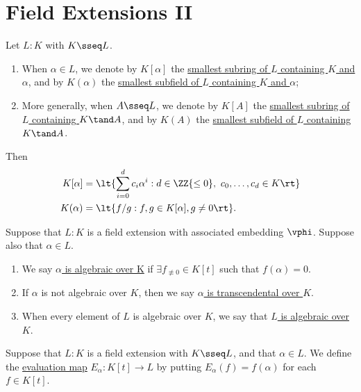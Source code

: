 \documentclass[a4paper]{article}
\begin{document}
\section{Field Extensions II}
\begin{tdefinition}
  Let \( L:K \) with \( K\sseq L \).
  \begin{enumerate}[label=(\roman*)]
    \item When \( \alpha\in L \), we denote by \( K[\alpha] \) the \ul{smallest subring of \( L \) containing \( K \) and \( \alpha \)}, and by \( K(\alpha) \) the \ul{smallest subfield of \( L \) containing \( K \) and \( \alpha \)};
    \item More generally, when \( A\sseq L \), we denote by \( K[A] \) the \ul{smallest subring of \( L \) containing \( K \tand A \)}, and by \( K(A) \) the \ul{smallest subfield of \( L \) containing \( K \tand A \)}.
  \end{enumerate}
  Then \begin{align*}
    K[\alpha] &= \lt\{ \sum_{i=0}^{d}c_i\alpha^i : d\in \ZZ{\leq 0},\ c_0,\ldots,c_d\in K \rt\} \\
    K(\alpha) &= \lt\{ f/g : f,g\in K[\alpha], g\neq 0 \rt\}.
  \end{align*}
\end{tdefinition}

\begin{tdefinition}
  Suppose that \( L: K \) is a field extension with associated embedding \( \vphi \).
  Suppose also that \( \alpha\in L \). \begin{enumerate}[label=(\roman*)]
    \item We say \ul{\( \alpha \) is algebraic over K} if \( \exists f_{\not\equiv 0} \in K[t] \) such that \( f(\alpha)=0 \).
    \item If \( \alpha \) is not algebraic over \( K \), then we say \ul{\( \alpha \) is transcendental over \( K \)}.
    \item When every element of \( L \) is algebraic over \( K \), we say that \ul{\( L \) is algebraic over \( K \)}.
  \end{enumerate}
\end{tdefinition}

\begin{tdefinition}
  Suppose that \( L: K \) is a field extension with \( K \sseq L \), and that \( \alpha\in L \).
  We define the \ul{evaluation map} \( E_\alpha : K[t] \to L \) by putting \( E_\alpha(f) = f(\alpha) \) for each \( f \in K[t] \).
\end{tdefinition}
\end{document}
